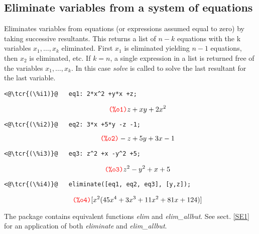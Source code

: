 \documentclass[../Maxima_Workbook.tex]{subfiles}
\begin{document}
\subsection{Eliminate variables from a system of equations}

\lz {} \hfill \tcr{[function]}

\lz Eliminates variables from equations (or expressions assumed equal to zero) by taking
successive resultants. This returns a list of $ n - k $ equations with the k variables $ x_1,\dots,x_k $ eliminated. First $ x_1 $ is eliminated yielding $ n-1 $ equations, then $ x_2 $ is eliminated, etc. If $ k = n $, a single expression in a list is returned free of the variables $ x_1,\dots,x_k $. In this case \emph{solve} is called to solve the last resultant for the last variable.

\lz \begin{small}
\color{blue} \leqn
\begin{lstlisting}
<@\tcr{(\%i1)}@   eq1: 2*x^2 +y*x +z;
\end{lstlisting}
\vspace{-6mm} \[\tag*{\tcr{\ttfamily (\%o1)}} z +x y +2 x^2 \]
\vspace{-10mm} 
\begin{lstlisting}
<@\tcr{(\%i2)}@   eq2: 3*x +5*y -z -1;
\end{lstlisting}
\vspace{-6mm} \[\tag*{\tcr{\ttfamily (\%o2)}} -z +5y +3x -1 \]
\vspace{-10mm} 
\begin{lstlisting}
<@\tcr{(\%i3)}@   eq3: z^2 +x -y^2 +5;
\end{lstlisting}
\vspace{-6mm} \[\tag*{\tcr{\ttfamily (\%o3)}} z^2 - y^2 + x + 5 \]
\vspace{-10mm} 
\begin{lstlisting}
<@\tcr{(\%i4)}@   eliminate([eq1, eq2, eq3], [y,z]);
\end{lstlisting}
\vspace{-5mm} \[\tag*{\tcr{\ttfamily (\%o4)}} [x^2 (45 x^4 + 3 x^3 + 11 x^2 + 81 x + 124)] \]
\color{black} \reqn
\end{small}
\vspace{-4mm} 

The  package contains equivalent functions \emph{elim} and \emph{elim\_allbut}. See sect. \ref{SE1} for an application of both \emph{eliminate} and \emph{elim\_allbut}.
\end{document}
